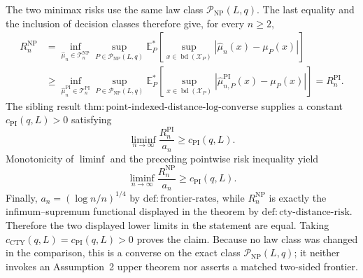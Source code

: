 The two minimax risks use the same law class \(\mathcal P_{\mathrm{NP}}(L,q)\).  The last equality and the inclusion of decision classes therefore give, for every \(n\geq2\),
\[
\begin{aligned}
 R_n^{\mathrm{NP}}
 &=\inf_{\widehat\mu_n\in\mathcal T_n^{\mathrm{NP}}}
   \sup_{P\in\mathcal P_{\mathrm{NP}}(L,q)}
   \mathbb E_P^*\!\left[
     \sup_{x\in\operatorname{bd}(\mathcal X_P)}
     |\widehat\mu_n(x)-\mu_P(x)|
   \right]\\
 &\geq
   \inf_{\widehat\mu_n^{\mathrm{PI}}\in\mathcal T_n^{\mathrm{PI}}}
   \sup_{P\in\mathcal P_{\mathrm{NP}}(L,q)}
   \mathbb E_P^*\!\left[
     \sup_{x\in\operatorname{bd}(\mathcal X_P)}
     |\widehat\mu_{n,P}^{\mathrm{PI}}(x)-\mu_P(x)|
   \right]
 =R_n^{\mathrm{PI}}.
\end{aligned}
\]
The sibling result \(\mathrm{thm:point\text{-}indexed\text{-}distance\text{-}log\text{-}converse}\) supplies a constant \(c_{\mathrm{PI}}(q,L)>0\) satisfying
\[
 \liminf_{n\to\infty}\frac{R_n^{\mathrm{PI}}}{a_n}
 \geq c_{\mathrm{PI}}(q,L).
\]
Monotonicity of \(\liminf\) and the preceding pointwise risk inequality yield
\[
 \liminf_{n\to\infty}\frac{R_n^{\mathrm{NP}}}{a_n}
 \geq c_{\mathrm{PI}}(q,L).
\]
Finally, \(a_n=(\log n/n)^{1/4}\) by \(\mathrm{def:frontier\text{-}rates}\), while \(R_n^{\mathrm{NP}}\) is exactly the infimum--supremum functional displayed in the theorem by \(\mathrm{def:cty\text{-}distance\text{-}risk}\).  Therefore the two displayed lower limits in the statement are equal.  Taking \(c_{\mathrm{CTY}}(q,L)=c_{\mathrm{PI}}(q,L)>0\) proves the claim.  Because no law class was changed in the comparison, this is a converse on the exact class \(\mathcal P_{\mathrm{NP}}(L,q)\); it neither invokes an Assumption~2 upper theorem nor asserts a matched two-sided frontier.